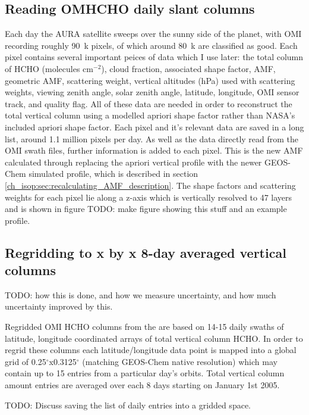     
  \subsection{Reading OMHCHO daily slant columns}
    Each day the AURA satellite sweeps over the sunny side of the planet, with OMI recording roughly 90~k pixels, of which around 80~k are classified as good.
    Each pixel contains several important peices of data which I use later: the total column of HCHO (molecules cm$^{-2}$), cloud fraction, associated shape factor, AMF, geometric AMF, scattering weight, vertical altitudes (hPa) used with scattering weights, viewing zenith angle, solar zenith angle, latitude, longitude, OMI sensor track, and quality flag.
    All of these data are needed in order to reconstruct the total vertical column using a modelled apriori shape factor rather than NASA's included apriori shape factor.
    Each pixel and it's relevant data are saved in a long list, around 1.1 million pixels per day.
    As well as the data directly read from the OMI swath files, further information is added to each pixel.
    This is the new AMF calculated through replacing the apriori vertical profile with the newer GEOS-Chem simulated profile, which is described in section \ref{ch_isop:sec:recalculating_AMF_description}.
    The shape factors and scattering weights for each pixel lie along a z-axis which is vertically resolved to 47 layers and is shown in figure TODO: make figure showing this stuff and an example profile.
    
  \subsection{Regridding to x by x 8-day averaged vertical columns}
    TODO: how this is done, and how we measure uncertainty, and how much uncertainty improved by this.
    
    Regridded OMI HCHO columns from the are based on 14-15 daily swaths of latitude, longitude coordinated arrays of total vertical column HCHO.
    In order to regrid these columns each latitude/longitude data point is mapped into a global grid of 0.25$^{\circ}$x0.3125$^{\circ}$ (matching GEOS-Chem native resolution) which may contain up to 15 entries from a particular day's orbits.
    Total vertical column amount entries are averaged over each 8 days starting on January 1st 2005.
    
    TODO: Discuss saving the list of daily entries into a gridded space.
    

